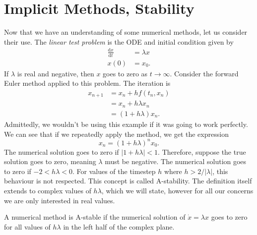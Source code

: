 \section{Implicit Methods, Stability}


Now that we have an understanding of some numerical methods, let us consider their use.
The \textit{linear test problem} is the ODE and initial condition given by
\begin{equation*}
    \begin{aligned}
        \frac{\mathrm{d}x}{\mathrm{d}t} &= \lambda x \\
        x(0) &= x_0.
    \end{aligned}
\end{equation*}
If $\lambda$ is real and negative, then $x$ goes to zero as $t \rightarrow \infty$.
Consider the forward Euler method applied to this problem. The iteration is
\begin{align*}
    x_{n+1} &= x_n + h f(t_n, x_n) \\
    &= x_n + h \lambda  x_n \\
    &= (1 + h \lambda) x_n.
\end{align*}
Admittedly, we wouldn't be using this example if it was going to work perfectly.
We can see that if we repeatedly apply the method, we get the expression
\begin{equation*}
    x_n = (1 + h \lambda)^n x_0.
\end{equation*}
The numerical solution goes to zero if $|1 + h \lambda| < 1$. 
Therefore, suppose the true solution goes to zero, meaning $\lambda$ must be negative.
The numerical solution goes to zero if $-2 < h \lambda < 0$.
For values of the timestep $h$ where $h > 2/|\lambda|$, this behaviour is not respected.
This concept is called A-stability.
The definition itself extends to complex values of $h \lambda$, which we will state, however for all our concerns we are only interested in real values.

\begin{definition}
    A numerical method is A-stable if the numerical solution of $\dot{x} = \lambda x$ goes to zero for all values of $h \lambda $ in the left half of the complex plane.    
\end{definition}

